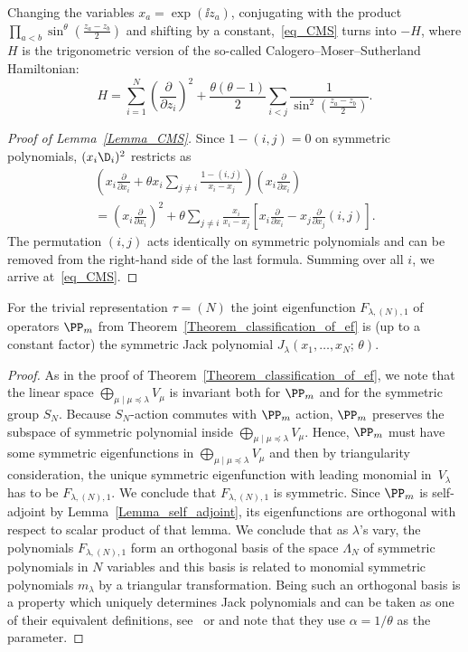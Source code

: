 \begin{rema} Changing the variables  $x_a=\exp(\ii z_a)$, conjugating with the product $\prod_{a<b} \sin^{\theta}\left( \frac{z_a-z_b}{2}\right)$ and shifting by a constant,~\eqref{eq_CMS} turns into $-H$, where $H$ is the trigonometric version of the so-called Calogero--Moser--Sutherland Hamiltonian:
$$
 H=\sum_{i=1}^N \left(\frac{\partial}{\partial z_i}\right)^2 + \frac{\theta(\theta-1)}{2}\sum_{i<j}  \frac{1}{\sin^2 \left(\frac{z_a-z_b}{2}\right)}.
$$

\end{rema}
\begin{proof}[Proof of Lemma~\ref{Lemma_CMS}] Since $1-(i,j)=0$ on symmetric polynomials, $(x_i \D_i)^2$ restricts as
\begin{multline*}
 \left(x_i \frac{\partial}{\partial x_i} + \theta x_i \sum_{j\ne i} \frac{1-(i,j)}{x_i-x_j}\right) \left(x_i \frac{\partial}{\partial x_i}\right)\\ =
 \left(x_i \frac{\partial}{\partial x_i}\right)^2+\theta \sum_{ j\ne i} \frac{x_i}{x_i-x_j} \left[ x_i \frac{\partial}{\partial x_i} - x_j \frac{\partial}{\partial x_j} (i,j)\right].
\end{multline*}
The permutation $(i,j)$ acts identically on symmetric polynomials and can be removed from the right-hand side of the last formula. Summing over all $i$, we arrive at~\eqref{eq_CMS}.
\end{proof}
\begin{lemma} \label{Lemma_Symmetric_is_Jack}
 For the trivial representation $\tau=(N)$ the joint eigenfunction $F_{\lambda,(N),1}$ of operators $\PP_m$ from Theorem~\ref{Theorem_classification_of_ef} is (up to a constant factor) the symmetric Jack polynomial $J_\lambda(x_1,\dots,x_N;\, \theta)$.
\end{lemma}
\begin{proof}
 As in the proof of Theorem~\ref{Theorem_classification_of_ef}, we note that the linear space $\bigoplus\limits_{\mu\mid \mu\preceq \lambda} V_{\mu}$
 is invariant  both for $\PP_m$ and for the symmetric group $S_N$. Because $S_N$-action commutes with $\PP_m$ action, $\PP_m$ preserves the subspace of symmetric polynomial inside $\bigoplus\limits_{\mu\mid \mu\preceq \lambda} V_{\mu}$. Hence, $\PP_m$ must have some symmetric eigenfunctions in  $\bigoplus\limits_{\mu\mid \mu\preceq \lambda} V_{\mu}$ and then by triangularity consideration, the unique symmetric eigenfunction with leading monomial in~$V_\lambda$ has to be $F_{\lambda,(N),1}$. We conclude that $F_{\lambda,(N),1}$ is symmetric. Since $\PP_m$ is self-adjoint by Lemma~\ref{Lemma_self_adjoint}, its eigenfunctions are orthogonal with respect to scalar product of that lemma. We conclude that as $\lambda$'s vary, the polynomials $F_{\lambda,(N),1}$ form an orthogonal basis of the space $\Lambda_N$ of symmetric polynomials in $N$ variables and this basis is related to monomial symmetric polynomials $m_\lambda$ by a triangular transformation. Being such an orthogonal basis is a property which uniquely determines Jack polynomials and can be taken as one of their equivalent definitions, see~\cite{stanley1989some} or \cite[Section 6.10]{macdonald1998symmetric} and note that they use $\alpha=1/\theta$ as the parameter.
\end{proof}
